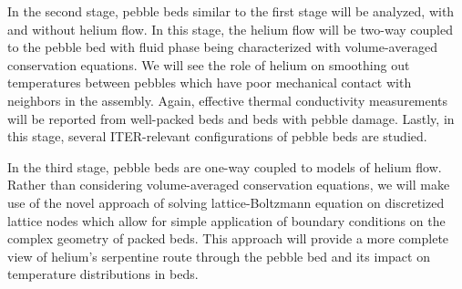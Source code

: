In the second stage, pebble beds similar to the first stage will be analyzed, with and without helium flow. In this stage, the helium flow will be two-way coupled to the pebble bed with fluid phase being characterized with volume-averaged conservation equations. We will see the role of helium on smoothing out temperatures between pebbles which have poor mechanical contact with neighbors in the assembly. Again, effective thermal conductivity measurements will be reported from well-packed beds and beds with pebble damage. Lastly, in this stage, several ITER-relevant configurations of pebble beds are studied. 

In the third stage, pebble beds are one-way coupled to models of helium flow. Rather than considering volume-averaged conservation equations, we will make use of the novel approach of solving lattice-Boltzmann equation on discretized lattice nodes which allow for simple application of boundary conditions on the complex geometry of packed beds. This approach will provide a more complete view of helium's serpentine route through the pebble bed and its impact on temperature distributions in beds.





